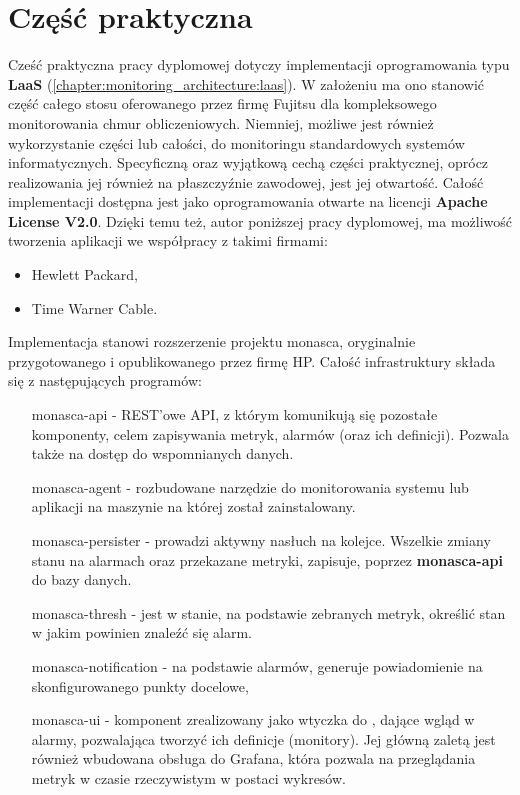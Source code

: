 \chapter{Część praktyczna}
\label{chapter:application}


Cześć praktyczna pracy dyplomowej dotyczy implementacji oprogramowania typu \textbf{LaaS} (\ref{chapter:monitoring_architecture:laas}).
W założeniu ma ono stanowić część całego stosu oferowanego przez firmę Fujitsu dla kompleksowego monitorowania chmur obliczeniowych.
Niemniej, możliwe jest również wykorzystanie części lub całości, do monitoringu standardowych systemów informatycznych. 
Specyficzną oraz wyjątkową cechą części praktycznej, oprócz realizowania jej również na płaszczyźnie zawodowej, jest jej otwartość.
Całość implementacji dostępna jest jako oprogramowania otwarte na licencji \textbf{Apache License V2.0}. Dzięki temu też, autor poniższej pracy dyplomowej, ma możliwość tworzenia aplikacji we współpracy z takimi firmami:
\begin{itemize}
    \item Hewlett Packard,
    \item Time Warner Cable.
\end{itemize}

Implementacja stanowi rozszerzenie projektu monasca, oryginalnie przygotowanego i opublikowanego przez firmę HP.
Całość infrastruktury składa się z następujących programów:
\begin{itemize}
    \item[monasca-api] - REST'owe API, z którym komunikują się pozostałe komponenty, celem zapisywania metryk, alarmów (oraz ich definicji).
    Pozwala także na dostęp do wspomnianych danych.
    \item[monasca-agent] - rozbudowane narzędzie do monitorowania systemu lub aplikacji na maszynie na której został zainstalowany.
    \item[monasca-persister] - prowadzi aktywny nasłuch na kolejce. Wszelkie zmiany stanu na alarmach oraz przekazane metryki, zapisuje,
    poprzez \textbf{monasca-api} do bazy danych.
    \item[monasca-thresh] - jest w stanie, na podstawie zebranych metryk, określić stan w jakim powinien znaleźć się alarm.
    \item[monasca-notification] - na podstawie alarmów, generuje powiadomienie na skonfigurowanego punkty docelowe,
    \item[monasca-ui] - komponent zrealizowany jako wtyczka do , dające wgląd w alarmy, pozwalająca tworzyć ich definicje (monitory).
    Jej główną zaletą jest również wbudowana obsługa do Grafana, która pozwala na przeglądania metryk w czasie rzeczywistym w postaci wykresów.
\end{itemize}

